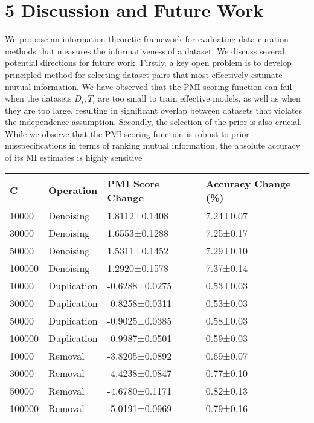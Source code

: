 \section{5 Discussion and Future Work}\label{discussion-and-future-work}

We propose an information-theoretic framework for evaluating data
curation methods that measures the informativeness of a dataset. We
discuss several potential directions for future work. Firstly, a key
open problem is to develop principled method for selecting dataset pairs
that most effectively estimate mutual information. We have observed that
the PMI scoring function can fail when the datasets
\(D _ { i } , T _ { i }\) are too small to train effective models, as
well as when they are too large, resulting in significant overlap
between datasets that violates the independence assumption. Secondly,
the selection of the prior is also crucial. While we observe that the
PMI scoring function is robust to prior misspecifications in terms of
ranking mutual information, the absolute accuracy of its MI estimates is
highly sensitive

\begin{longtable}[]{@{}|l|l|l|l|@{}}
\toprule\noalign{}
\endhead
\bottomrule\noalign{}
\endlastfoot
\hline
C & Operation & PMI Score Change & Accuracy Change (\%) \\
\hline
10000 & Denoising & 1.8112±0.1408 & 7.24±0.07 \\
\hline
30000 & Denoising & 1.6553±0.1288 & 7.25±0.17 \\
\hline
50000 & Denoising & 1.5311±0.1452 & 7.29±0.10 \\
\hline
100000 & Denoising & 1.2920±0.1578 & 7.37±0.14 \\
\hline
10000 & Duplication & -0.6288±0.0275 & 0.53±0.03 \\
\hline
30000 & Duplication & -0.8258±0.0311 & 0.53±0.03 \\
\hline
50000 & Duplication & -0.9025±0.0385 & 0.58±0.03 \\
\hline
100000 & Duplication & -0.9987±0.0501 & 0.59±0.03 \\
\hline
10000 & Removal & -3.8205±0.0892 & 0.69±0.07 \\
\hline
30000 & Removal & -4.4238±0.0847 & 0.77±0.10 \\
\hline
50000 & Removal & -4.6780±0.1171 & 0.82±0.13 \\
\hline
100000 & Removal & -5.0191±0.0969 & 0.79±0.16 \\
\hline
\end{longtable}

